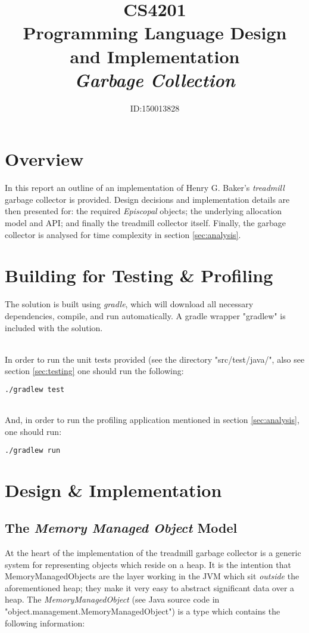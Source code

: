 \documentclass[]{article}
\title{CS4201\\Programming Language Design and Implementation\vspace*{1\baselineskip}\\\emph{Garbage Collection}}
\author{ID:150013828}
\begin{document}
\maketitle


\noindent

\section{Overview}
In this report an outline of an implementation of Henry G. Baker's \emph{treadmill} garbage collector is provided. Design decisions and implementation details are then presented for: the required \emph{Episcopal} objects; the underlying allocation model and API; and finally the treadmill collector itself. Finally, the garbage collector is analysed for time complexity in section \ref{sec:analysis}.

\section{Building for Testing \& Profiling}\label{sec:build}
The solution is built using \emph{gradle}, which will download all necessary dependencies, compile, and run automatically. A gradle wrapper "gradlew" is included with the solution.

\noindent\\
In order to run the unit tests provided (see the directory "src/test/java/", also see section \ref{sec:testing} one should run the following:
\begin{lstlisting}[frame=single, language=bash]
./gradlew test
\end{lstlisting}

\noindent\\
And, in order to run the profiling application mentioned in section \ref{sec:analysis}, one should run:
\begin{lstlisting}[frame=single, language=bash]
./gradlew run
\end{lstlisting}

\section{Design \& Implementation}\label{sec:design}

\subsection{The \emph{Memory Managed Object} Model}\label{sec:design:objects}
At the heart of the implementation of the treadmill garbage collector is a generic system for representing objects which reside on a heap. It is the intention that MemoryManagedObjects are the layer working in the JVM which sit \emph{outside} the aforementioned heap; they make it very easy to abstract significant data over a heap. The \emph{MemoryManagedObject} (see Java source code in "object.management.MemoryManagedObject") is a type which contains the following information:
\end{document}
